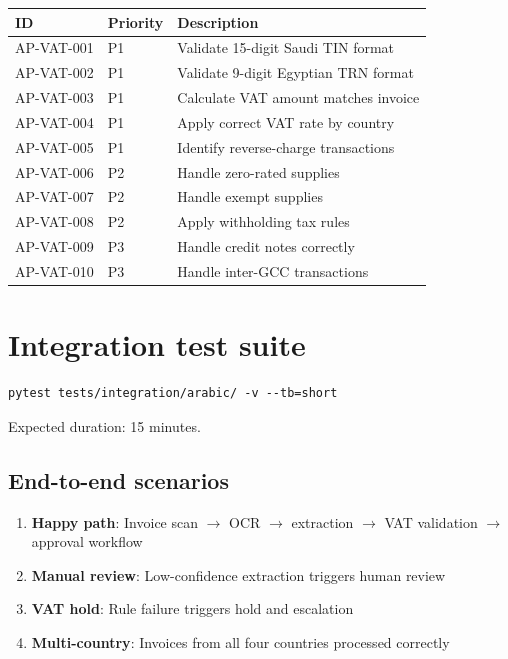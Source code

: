 \begin{tabularx}{\linewidth}{@{}l l X@{}}
\toprule
\textbf{ID} & \textbf{Priority} & \textbf{Description} \\ \midrule
AP-VAT-001 & P1 & Validate 15-digit Saudi TIN format \\
AP-VAT-002 & P1 & Validate 9-digit Egyptian TRN format \\
AP-VAT-003 & P1 & Calculate VAT amount matches invoice \\
AP-VAT-004 & P1 & Apply correct VAT rate by country \\
AP-VAT-005 & P1 & Identify reverse-charge transactions \\
AP-VAT-006 & P2 & Handle zero-rated supplies \\
AP-VAT-007 & P2 & Handle exempt supplies \\
AP-VAT-008 & P2 & Apply withholding tax rules \\
AP-VAT-009 & P3 & Handle credit notes correctly \\
AP-VAT-010 & P3 & Handle inter-GCC transactions \\
\bottomrule
\end{tabularx}

\section{Integration test suite}

\begin{lstlisting}[basicstyle=\ttfamily\small]
pytest tests/integration/arabic/ -v --tb=short
\end{lstlisting}

Expected duration: 15 minutes.

\subsection{End-to-end scenarios}

\begin{enumerate}
  \item \textbf{Happy path}: Invoice scan $\rightarrow$ OCR $\rightarrow$ extraction
        $\rightarrow$ VAT validation $\rightarrow$ approval workflow
  \item \textbf{Manual review}: Low-confidence extraction triggers human review
  \item \textbf{VAT hold}: Rule failure triggers hold and escalation
  \item \textbf{Multi-country}: Invoices from all four countries processed correctly
\end{enumerate}

